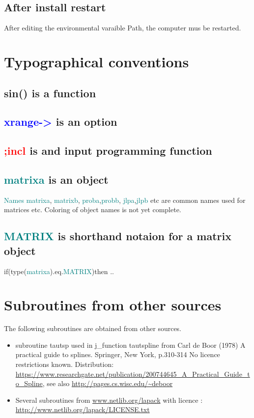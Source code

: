 \subsection{After install restart} 
\label{afterinstall} 
After editing the environmental varaible Path, the computer mus be restarted. 
\section{Typographical conventions} 
\label{typo} 
\subsection{\textcolor{VioletRed}{sin}() is a function} 
\label{wrfunc} 
\subsection{\textcolor{blue}{xrange->} is an option} 
\label{wropt} 
\subsection{\textcolor{Red}{;incl} is and input programming function} 
\label{wrinpu} 
\subsection{\textcolor{teal}{matrixa} is an object} 
\label{wrobj} 
\textcolor{teal}{Names} \textcolor{teal}{matrixa}, \textcolor{teal}{matrixb}, \textcolor{teal}{proba},\textcolor{teal}{probb}, \textcolor{teal}{jlpa},\textcolor{teal}{jlpb} etc 
are common names used for matrices etc. Coloring of object names is not yet complete. 
\subsection{\textcolor{teal}{MATRIX} is shorthand notaion for a matrix object} 
\label{wrtype} 
\textcolor{VioletRed}{if}(\textcolor{VioletRed}{type}(\textcolor{teal}{matrixa}).eq.\textcolor{teal}{MATRIX})\textcolor{VioletRed}{then} .. 
\section{Subroutines from other sources} 
\label{license} 
The following subroutines are obtained from other sources. 
\begin{itemize} 
 
\item  subroutine tautsp used in j\_function tautspline 
from Carl de Boor (1978) A practical guide to splines. Springer, New York, p.310-314 
No licence restrictions known. 
Distribution: \\ 
\url{https://www.researchgate.net/publication/200744645_A_Practical_Guide_to_Spline}, 
see also \url{ http://pages.cs.wisc.edu/~deboor} 
 
 
 
\item Several subroutines from \url{www.netlib.org/lapack} 
with licence :\\ 
\url{http://www.netlib.org/lapack/LICENSE.txt} 
\end{itemize} 
